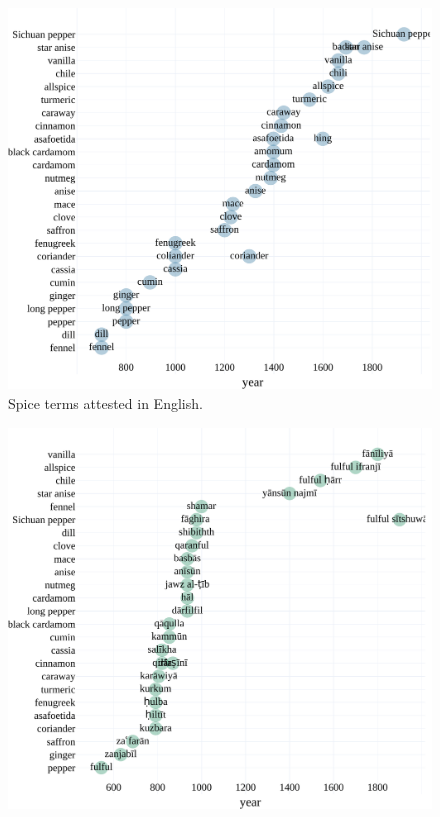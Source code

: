 \begin{figure}[!ht]
  \centering
  \includegraphics[width=\linewidth]{imgs/plots/attestation_en.pdf}
  \caption{Spice terms attested in English.}
  \label{fig:attestation_en}
\end{figure}

\begin{figure}[!ht]
  \centering
  \includegraphics[width=\linewidth]{imgs/plots/attestation_ar.pdf}
  \caption{}
  \label{fig:attestation_ar}
\end{figure}

